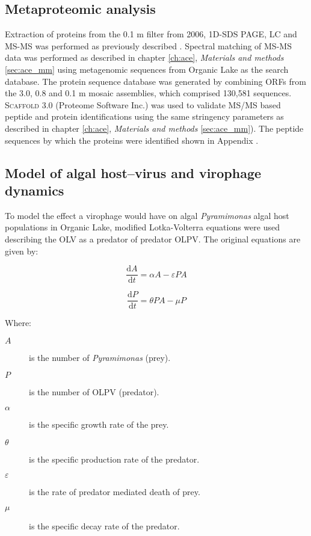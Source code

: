 \subsection{Metaproteomic analysis}
Extraction of proteins from the 0.1 \textmu{}m filter from 2006, \ac{1D-SDS PAGE}, \ac{LC} and \ac{MS-MS} was performed as previously described \cite{Ng2010a, Lauro2011}.
Spectral matching of \ac{MS-MS} data was performed as described in chapter \ref{ch:ace}, \emph{Materials and methods} \ref{sec:ace_mm} using metagenomic sequences from Organic Lake as the search database.
The protein sequence database was generated by combining \acp{ORF} from the 3.0, 0.8 and 0.1 \textmu{}m mosaic assemblies, which comprised 130,581 sequences. 
\textsc{Scaffold} 3.0 (Proteome Software Inc.) was used to validate MS/MS based peptide and protein identifications using the same stringency parameters as described in chapter \ref{ch:ace}, \emph{Materials and methods} \ref{sec:ace_mm}). 
The peptide sequences by which the proteins were identified shown in Appendix .

\subsection[Model of algal host--virus and virophage dynamics]{Model of algal host--virus and virophage dynamics}
To model the effect a virophage would have on algal \emph{Pyramimonas} algal host populations in Organic Lake, modified Lotka-Volterra equations were used describing the \ac{OLV} as a predator of predator \ac{OLPV}. 
The original equations are given by:

\begin{equation}
\frac{\mathrm{d}A}{\mathrm{d}t}=\alpha A - \varepsilon PA
\label{eqn:lokprey}
\end{equation}

\begin{equation}
\frac{\mathrm{d}P}{\mathrm{d}t}= \theta PA - \mu P
\label{eqn:lokpred}
\end{equation}

Where:
\begin{description}
\item[$A$] is the number of \emph{Pyramimonas} (prey).
\item[$P$] is the number of \ac{OLPV} (predator).
\item[$\alpha$] is the specific growth rate of the prey.
\item[$\theta$] is the specific production rate of the predator.
\item[$\varepsilon$] is the rate of predator mediated death of prey.
\item[$\mu$] is the specific decay rate of the predator.
\end{description}

